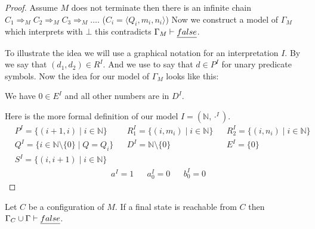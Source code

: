 \begin{proof}
	Assume $M$ does not terminate then there is an infinite chain $C_1\Rightarrow_M C_2\Rightarrow_M C_3\Rightarrow_M\dots$. ($C_i=\langle Q_i,m_i,n_i\rangle$) Now we construct a model of $\Gamma_M$ which interprets \false{} with $\bot$ this contradicts $\Gamma_M\vdash\emph{false}$.
	
	To illustrate the idea we will use a graphical notation for an interpretation $I$.
	By
	we say that $(d_1,d_2)\in R^I$. And we use
	to say that $d\in P^I$ for unary predicate symbols. Now the idea for our model of $\Gamma_M$ looks like this:
	
	\begin{figure}[H]
		
	\end{figure}
	We have $0\in E^I$ and all other numbers are in $D^I$.
	
	Here is the more formal definition of our model $I=(\mathbb{N},\cdot^I)$.
	\begin{align*}
		  & P^I=\{(i+1,i)\mid i\in\mathbb{N}\}              &   & R_1^I=\{(i,m_i)\mid i\in\mathbb{N}\} &   & R_2^I=\{(i,n_i)\mid i\in\mathbb{N}\} \\
		  & Q^I=\{ i\in\mathbb{N}\setminus\{0\}\mid Q=Q_i\} &   & D^I=\mathbb{N}\setminus\{0\}         &   & E^I=\{0\}                            \\
		& S^I=\{(i,i+1)\mid i\in\mathbb{N}\}
	\end{align*}
	\begin{align*}
		  & a^I=1 &   & a_0^I=0 &   & b_0^I=0 
	\end{align*}
\end{proof}
\begin{claim}\label{cla.18}
	Let $C$ be a configuration of $M$. If a final state is reachable from $C$ then $\Gamma_C\cup\Gamma\vdash\emph{false}$.
\end{claim}
